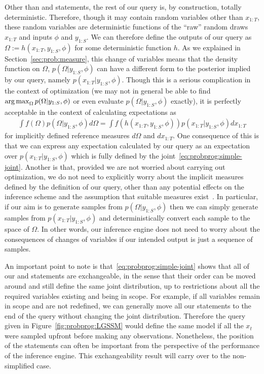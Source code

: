 Other than \sample and \observe statements, the rest of our query is, by construction, totally deterministic.  Therefore,
though it may contain random variables other than $x_{1:T}$, these random variables are deterministic
functions of the ``raw'' random draws $x_{1:T}$ and inputs $\phi$ and $y_{1:S}$.  We can therefore 
define the outputs of our query as $\Omega := h(x_{1:T},y_{1:S},\phi)$ for some deterministic function $h$.
As we explained in Section~\ref{sec:prob:measure}, this change of variables means that the density function on $\Omega$,
$p(\Omega | y_{1:S}, \phi) $
can have a different form to the posterior implied by our query, namely $p(x_{1:T} | y_{1:S}, \phi)$.
  Though this is a serious complication in the
context of optimization (we may not in general be able to find $\operatorname*{arg\,max}_{\Omega} p(\Omega|y_{1:S},\phi)$
or even evaluate $p(\Omega | y_{1:S}, \phi)$ exactly), it
is perfectly acceptable in the context of calculating expectations as
\begin{align}
\int f(\Omega) p(\Omega | y_{1:S}, \phi) d\Omega = \int f(h(x_{1:T}, y_{1:S}, \phi)) p(x_{1:T} | y_{1:S}, \phi) dx_{1:T}
\end{align}
for implicitly defined reference measures $d\Omega$ and $dx_{1:T}$.  One consequence of this is that
we can express any expectation calculated by our query as an expectation over $p(x_{1:T} | y_{1:S}, \phi)$
which is fully defined by the joint~\eqref{eq:probprog:simple-joint}.  Another is that, provided we are not worried
about carrying out optimization, we do not need to explicitly worry about the implicit measures defined
by the definition of our query, other than any potential effects on the inference scheme and the assumption
that suitable measures exist~\citep{staton2016semantics}.  In particular,
if our aim is to generate samples from $p(\Omega | y_{1:S}, \phi)$ then
we can simply generate samples from $p(x_{1:T} | y_{1:S}, \phi)$ and deterministically convert each
sample to the space of $\Omega$.  In other words, our inference engine does not need to worry about
the consequences of changes of variables if our intended output is just a sequence of samples.

An important point to note is that~\eqref{eq:probprog:simple-joint} shows that all of our \sample
and \observe statements are exchangeable, in the sense that their order can be moved around and
still define the same joint distribution, up to restrictions about all the required variables
 existing and being in scope.  
For example, if all variables remain in scope
and are not redefined, we can generally move all our \observe statements to the end of the query
without changing the joint distribution.  Therefore the query given in Figure~\ref{fig:probprog:LGSSM}
would define the same model if all the $x_t$ were sampled upfront before making any observations.
Nonetheless, the position of the \observe statements
can often be important from the perspective of the performance of the inference engine.  This exchangeability
result will carry over to the non-simplified case.

